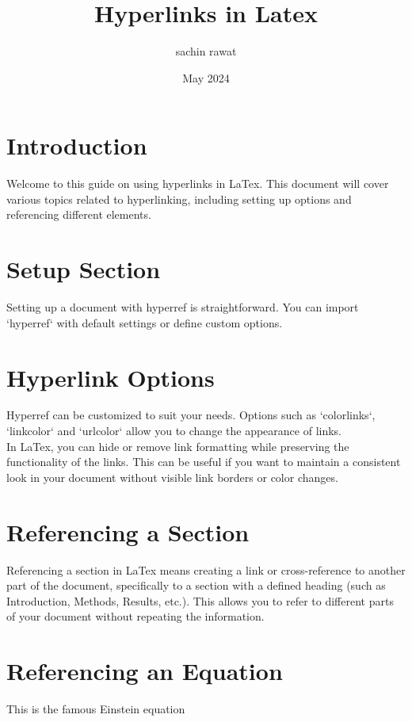 \documentclass{article}
\title{Hyperlinks in Latex}
\author{sachin rawat}
\date{May 2024}
\begin{document}
\maketitle    

\section{Introduction}
\label{sec:intro}
Welcome to this guide on using hyperlinks in LaTex. This document will cover various topics related to hyperlinking, including setting up options and referencing different elements.

\section{Setup Section}
\label{sec:setup}
Setting up a document with hyperref is straightforward. You can import `hyperref` with default settings or define custom options.

\section{Hyperlink Options}
\label{sec:options}
Hyperref can be customized to suit your needs. Options such as `colorlinks`, `linkcolor` and `urlcolor` allow you to change the appearance of links.\\

In LaTex, you can hide or remove link formatting while preserving the functionality of the links. This can be useful if you want to maintain a consistent look in your document without visible link borders or color changes.

\section{Referencing a Section}
\label{sec:section}
Referencing a section in LaTex means creating a link or cross-reference to another part of the document, specifically to a section with a defined heading (such as Introduction, Methods, Results, etc.). This allows you to refer to different parts of your document without repeating the information.

\section{Referencing an Equation}
\label{sec:equation}
This is the famous Einstein equation 
\end{document}
